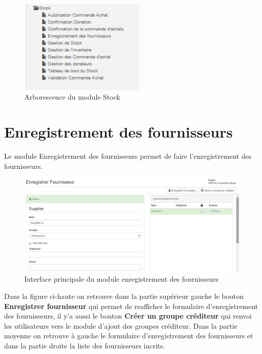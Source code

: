 \documentclass[12pt,a4paper]{report}
\begin{document}
\begin{figure}[h]
\begin{center}
\includegraphics[width=6cm]{pic/StockManagement.png}
\end{center}
\caption{Arborescence du module Stock}
\label{Arborescence du module Stock}
\end{figure}


\section{Enregistrement des fournisseurs}
Le module Enregistrement des fournisseurs permet de faire l'enregistrement des fournisseurs.

\begin{figure}[h]
\begin{center}
\includegraphics[width=14cm]{pic/InterEnrFourn.png}
\end{center}
\caption{Interface principale du module enregistrement des fournisseurs}
\label{Interface principale du module enregistrement des fournisseurs}
\end{figure}

Dans la figure ci-haute on retrouve dans la partie supérieur gauche le bouton \textbf{Enregistrer fournisseur} qui permet de reafficher le formulaire d'enregistrement des fournisseurs, il y'a aussi le bouton \textbf{Créer un groupe créditeur} qui renvoi les utilisateurs vers le module d'ajout des groupes créditeur. Dans la partie moyenne on retrouve à gauche le formulaire d'enregistrement des fournisseurs et dans la partie droite la liste des fournisseurs incrits.
\end{document}
